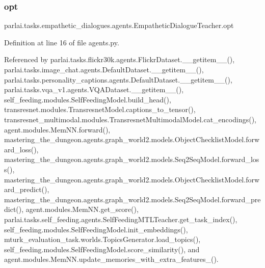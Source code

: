 \mbox{\label{classparlai_1_1tasks_1_1empathetic__dialogues_1_1agents_1_1EmpatheticDialogueTeacher_a5f7a6df7d74bac8fce918c8216db33f9}} 
\subsubsection{\texorpdfstring{opt}{opt}}
{\footnotesize\ttfamily parlai.\+tasks.\+empathetic\+\_\+dialogues.\+agents.\+Empathetic\+Dialogue\+Teacher.\+opt}



Definition at line 16 of file agents.\+py.



Referenced by parlai.\+tasks.\+flickr30k.\+agents.\+Flickr\+Dataset.\+\_\+\+\_\+getitem\+\_\+\+\_\+(), parlai.\+tasks.\+image\+\_\+chat.\+agents.\+Default\+Dataset.\+\_\+\+\_\+getitem\+\_\+\+\_\+(), parlai.\+tasks.\+personality\+\_\+captions.\+agents.\+Default\+Dataset.\+\_\+\+\_\+getitem\+\_\+\+\_\+(), parlai.\+tasks.\+vqa\+\_\+v1.\+agents.\+V\+Q\+A\+Dataset.\+\_\+\+\_\+getitem\+\_\+\+\_\+(), self\+\_\+feeding.\+modules.\+Self\+Feeding\+Model.\+build\+\_\+head(), transresnet.\+modules.\+Transresnet\+Model.\+captions\+\_\+to\+\_\+tensor(), transresnet\+\_\+multimodal.\+modules.\+Transresnet\+Multimodal\+Model.\+cat\+\_\+encodings(), agent.\+modules.\+Mem\+N\+N.\+forward(), mastering\+\_\+the\+\_\+dungeon.\+agents.\+graph\+\_\+world2.\+models.\+Object\+Checklist\+Model.\+forward\+\_\+loss(), mastering\+\_\+the\+\_\+dungeon.\+agents.\+graph\+\_\+world2.\+models.\+Seq2\+Seq\+Model.\+forward\+\_\+loss(), mastering\+\_\+the\+\_\+dungeon.\+agents.\+graph\+\_\+world2.\+models.\+Object\+Checklist\+Model.\+forward\+\_\+predict(), mastering\+\_\+the\+\_\+dungeon.\+agents.\+graph\+\_\+world2.\+models.\+Seq2\+Seq\+Model.\+forward\+\_\+predict(), agent.\+modules.\+Mem\+N\+N.\+get\+\_\+score(), parlai.\+tasks.\+self\+\_\+feeding.\+agents.\+Self\+Feeding\+M\+T\+L\+Teacher.\+get\+\_\+task\+\_\+index(), self\+\_\+feeding.\+modules.\+Self\+Feeding\+Model.\+init\+\_\+embeddings(), mturk\+\_\+evaluation\+\_\+task.\+worlds.\+Topics\+Generator.\+load\+\_\+topics(), self\+\_\+feeding.\+modules.\+Self\+Feeding\+Model.\+score\+\_\+similarity(), and agent.\+modules.\+Mem\+N\+N.\+update\+\_\+memories\+\_\+with\+\_\+extra\+\_\+features\+\_\+().

